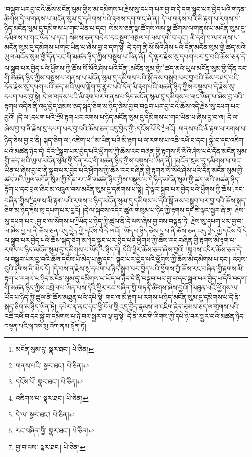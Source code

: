 །བསྒྲུབ་པར་བྱ་བའི་ཆོས་མངོན་སུམ་གྱིས་མ་དམིགས་པ་རྗེས་སུ་དཔག་པར་བྱ་བ་དེ་དག་སྒྲུབ་པར་བྱེད་པའི་གཏན་ཚིགས་དེ་ལ་གནས་པ་མངོན་སུམ་དུ་དམིགས་པའི་རྟགས་དག་གང་ཞེ་ན། དེ་ལ་གནས་པའི་མི་རྟག་པ་རགས་པ་ཉིད་མངོན་སུམ་དུ་དམིགས་པ་གང་ཡིན་པ་དང་། སེམས་ཅན་སྣ་ཚོགས་ལས་སྣ་ཚོགས་ལ་གནས་པ་མངོན་སུམ་དུ་དམིགས་པ་གང་ཡིན་པ་དང་། སེམས་ཅན་བདེ་བ་དང་སྡུག་བསྔལ་བ་ལས་དགེ་བ་དང་། མི་དགེ་བ་ལ་གནས་པ་མངོན་སུམ་དུ་དམིགས་པ་གང་ཡིན་པ་ཞེས་བྱ་བ་དག་སྟེ། དེ་དག་ནི་སོ་སོའི་ཤེས་པའི་དོན་མངོན་སུམ་གྱི་ཚད་མའི་ཡུལ་མངོན་སུམ་གྱི་དོན་རང་གི་མཚན་ཉིད་ཀྱིས་བསྡུས་པ་ཡིན་ནོ། །དེ་ལྟར་རྗེས་སུ་དཔག་པར་བྱ་བའི་ཆོས་ཅན་དེ་ལ་སྒྲུབ་པར་བྱེད་པའི་ཕྱོགས་ཀྱི་ཆོས་སོ་སོའི་ཤེས་པའི་དོན་:མངོན་སུམ་གྱི་\footnote{མངོན་སུམ་དུ་  སྣར་ཐང་།  པེ་ཅིན། }ཚད་མའི་ཡུལ་མངོན་སུམ་གྱི་དོན་རང་གི་མཚན་ཉིད་ཀྱིས་བསྡུས་པ་གནས་པ་མངོན་སུམ་དུ་དམིགས་པའི་སྒོ་ནས་བསྒྲུབ་པར་བྱ་བའི་ཆོས་བཤད་པའི་དོན་རྗེས་སུ་དཔག་པའི་ཚད་མའི་ཡུལ་ལྐོག་ཏུ་གྱུར་པའི་དོན་མི་རྟག་པའི་མཚན་ཉིད་ཀྱིས་བསྡུས་པ་དེ་རྗེས་སུ་དཔག་པར་བྱ་སྟེ། དེ་ལ་གནས་པའི་མི་རྟག་པར་གནས་པ་ཉིད་མངོན་སུམ་དུ་དམིགས་པ་གང་ཡིན་པ་ཞེས་བྱ་བའི་རྟགས་འདིས་ནི་འདུ་བྱེད་ཐམས་ཅད་སྐད་ཅིག་མ་ཉིད་ཅེས་བྱ་བ་བསྒྲུབ་པར་བྱ་བའི་ཆོས་འདི་རྗེས་སུ་དཔག་པར་བྱའོ། །དེ་ལ་:དཔག་པའི་\footnote{གནས་པའི་  སྣར་ཐང་།  པེ་ཅིན། }མི་རྟག་པར་རགས་པ་ཉིད་མངོན་སུམ་དུ་དམིགས་པ་གང་ཡིན་པ་ཞེས་བྱ་བ་ལ། དེ་ལ་ཞེས་བྱ་བ་ནི་རྗེས་སུ་དཔག་པར་བྱ་བའི་ཆོས་ཅན་འདུ་བྱེད་ཀྱི་:དངོས་པོ་དེ་\footnote{དངོས་པོ་  སྣར་ཐང་།  པེ་ཅིན། }ལའོ། །གནས་པའི་མི་རྟག་པ་རགས་པ་ཉིད་ཅེས་བྱ་བ་ནི། སྐད་ཅིག་ལ་:འཇིག་པ་\footnote{འཇིགས་པ་  སྣར་ཐང་།  པེ་ཅིན། }མ་ཡིན་པའི་མི་རྟག་པ་ལ་རགས་པ་འཆི་འཕོ་བ་དང་། སྐྱེ་བ་དང་འཇིག་པའི་མཚན་ཉིད་དེ། དེའི་\footnote{དེ་ལ་  སྣར་ཐང་།  པེ་ཅིན། }སྒྲུབ་པར་བྱེད་པའི་ཕྱོགས་ཀྱི་ཆོས་རང་བཞིན་གྱི་རྟགས་སོ་སོའི་ཤེས་པའི་དོན་མངོན་སུམ་གྱི་ཚད་མའི་ཡུལ་མངོན་སུམ་གྱི་དོན་རང་གི་མཚན་ཉིད་ཀྱིས་བསྡུས་པ་ཡིན་ནོ། །མངོན་སུམ་དུ་དམིགས་པ་གང་ཡིན་པ་ཞེས་བྱ་བ་ནི་སྒྲུབ་པར་བྱེད་པའི་ཕྱོགས་ཀྱི་ཆོས་རང་བཞིན་གྱི་རྟགས་སོ་སོའི་ཤེས་པའི་དོན་མངོན་སུམ་གྱི་ཚད་མའི་ཡུལ་མངོན་སུམ་ཀྱི་དོན་རང་གི་མཚན་ཉིད་ཀྱིས་བསྡུས་པ་དེ་ཉིད་མངོན་སུམ་གྱི་ཚད་མའི་མཚན་ཉིད་རྟོག་པ་དང་བྲལ་ཞིང་མ་འཁྲུལ་བས་མངོན་སུམ་དུ་དམིགས་པ་སྟེ། དེ་ལྟར་སྒྲུབ་པར་བྱེད་པའི་ཕྱོགས་ཀྱི་ཆོས་:རང་བཞིན་གྱིས་\footnote{རང་བཞིན་གྱི་  སྣར་ཐང་།  པེ་ཅིན། }རྟགས་མི་རྟག་པའི་རགས་པ་ཉིད་མངོན་སུམ་དུ་དམིགས་པ་དེའི་སྒོ་ནས་བསྒྲུབ་པར་བྱ་བའི་ཆོས་སྐད་ཅིག་མ་ཉིད་རྗེས་སུ་དཔག་པར་བྱའོ། །དེ་ལ་སྐབས་འདིར་ཚུལ་གསུམ་པ་ཉིད་ཀྱི་རྟགས་དང་ཇི་ལྟར་སྦྱར་ཞེ་ན། རྗེས་སུ་དཔག་པར་:བྱ་བ་ལ་སོགས་པ་\footnote{བྱ་བ་ལས་  སྣར་ཐང་།  པེ་ཅིན། }ཡོད་པ་ཉིད་ཀྱི་ཚུལ་ནི་དེ་ལས་ཞེས་བྱ་བས་བསྟན་ཏེ། རྗེས་སུ་དཔག་པར་བྱ་བ་ལ་ཞེས་བྱ་བ་ནི་ཆོས་ཅན་འདུ་བྱེད་ཀྱི་དངོས་པོ་དེ་ལའོ། །ཡོད་པ་ཉིད་ཅེས་བྱ་བ་ནི་ཆོས་ཅན་འདུ་བྱེད་ཀྱི་དངོས་པོ་དེ་ལ་སྒྲུབ་པར་བྱེད་པའི་ཆོས་སྐད་ཅིག་མ་ཉིད་སྒྲུབ་པར་བྱེད་པའི་ཕྱོགས་ཀྱི་ཆོས་རང་བཞིན་གྱི་རྟགས་མི་རྟག་པ་རགས་པ་ཉིད་མངོན་སུམ་དུ་དམིགས་པ་ཡོད་པ་ཉིད་དེ། དེའི་ཕྱིར་ཆོས་ཅན་ཞེས་བྱའོ། །སྐབས་འདིར་ཆོས་ཅན་དེ་ལ་བསྒྲུབ་པར་བྱ་བའི་ཆོས་དངོས་པོ་མེད་པ་རྒྱུ་དང་། སྒྲུབ་པར་བྱེད་པའི་ཕྱོགས་ཀྱི་ཆོས་མི་དམིགས་པ་དང་། འབྲས་བུའི་རྟགས་ནི་མེད་དོ། །དེ་བས་ན་རྗེས་སུ་དཔག་པ་ཉིད་སྒྲུབ་པར་བྱེད་པའི་ཕྱོགས་ཀྱི་ཆོས་རང་བཞིན་གྱི་རྟགས་མི་རྟག་པ་རགས་པ་ཉིད་མངོན་སུམ་དུ་དམིགས་པ་ཡོད་པ་ཉིད་དེ་ནི་བསྒྲུབ་པར་བྱ་བ་དང་སྒྲུབ་པར་བྱེད་པ་དེའི་བདག་གི་མཚན་ཉིད་ཀྱིས་འབྲེལ་པ་ཡིན་པས་དེའི་ཕྱིར་རང་བཞིན་གྱི་གཏན་ཚིགས་ཞེས་བྱའོ། །མཐུན་པའི་ཕྱོགས་ལ་ཡོད་པ་ཉིད་ཀྱི་ཚུལ་ནི་ཆོས་མཐུན་པའི་དཔེ་སྟེ། གང་ལ་མི་རྟག་པ་རགས་པ་ཉིད་མངོན་སུམ་དུ་དམིགས་པ་དེ་ནི་སྐད་ཅིག་མ་ཉིད་ཡིན་ཏེ། དཔེར་ན་ནང་དང་ཕྱི་རོལ་གྱི་འདུ་བྱེད་རྣམས་ལ་འཇིག་རྟེན་ཐམས་ཅད་ལ་གྲགས་པའི་འཆི་འཕོ་བ་དང་སྐྱེ་བ་དམིགས་པ་ཉེ་བར་སྦྱར་བ་ལྟ་བུ་སྟེ། དེ་ནི་རང་གི་རིགས་ཀྱི་དཔེ་ཉེ་བར་སྦྱར་བའི་མཚན་ཉིད་བསྟན་པའི་སྐབས་སུ་འོག་ནས་སྟོན་ཏོ། 